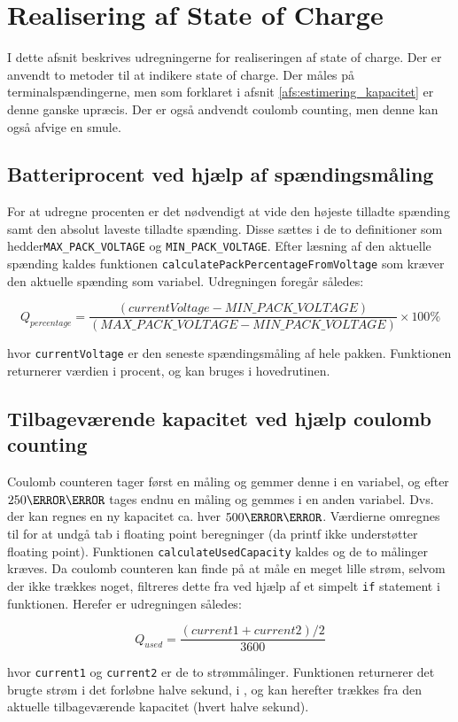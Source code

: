 \section{Realisering af State of Charge}\label{afs:SOC_realization}
I dette afsnit beskrives udregningerne for realiseringen af state of charge. Der er anvendt to metoder til at indikere state of charge. Der måles på terminalspændingerne, men som forklaret i afsnit \ref{afs:estimering_kapacitet} er denne ganske upræcis. Der er også andvendt coulomb counting, men denne kan også afvige en smule.

\subsection{Batteriprocent ved hjælp af spændingsmåling}
For at udregne procenten er det nødvendigt at vide den højeste tilladte spænding samt den absolut laveste tilladte spænding. Disse sættes i de to definitioner som hedder\newline \verb|MAX_PACK_VOLTAGE| og \verb|MIN_PACK_VOLTAGE|. Efter læsning af den aktuelle spænding kaldes funktionen \verb|calculatePackPercentageFromVoltage| som kræver den aktuelle spænding som variabel. Udregningen foregår således:

\begin {equation}
Q_{percentage} =  \frac{(\mathit{currentVoltage} - \mathit{MIN\_PACK\_VOLTAGE})}{(\mathit{MAX\_PACK\_VOLTAGE} - \mathit{MIN\_PACK\_VOLTAGE})} \times 100\percent
\label{eq:q_percentage}
\end {equation}

hvor \verb|currentVoltage| er den seneste spændingsmåling af hele pakken. Funktionen returnerer værdien i procent, og kan bruges i hovedrutinen.

\subsection{Tilbageværende kapacitet ved hjælp coulomb counting}
Coulomb counteren tager først en måling og gemmer denne i en variabel, og efter $250\milli\second$ tages endnu en måling og gemmes i en anden variabel. Dvs. der kan regnes en ny kapacitet ca. hver $500\milli\second$. Værdierne omregnes til \micro\ampere\space for at undgå tab i floating point beregninger (da printf ikke understøtter floating point). Funktionen \verb|calculateUsedCapacity| kaldes og de to målinger kræves. Da coulomb counteren kan finde på at måle en meget lille strøm, selvom der ikke trækkes noget, filtreres dette fra ved hjælp af et simpelt \verb|if| statement i funktionen. Herefer er udregningen således: 

\begin {equation}
Q_{used} =  \frac{(\mathit{current1} + \mathit{current2}) / 2}{3600}
\label{eq:q_used}
\end {equation}

hvor \verb|current1| og \verb|current2| er de to strømmålinger. Funktionen returnerer det brugte strøm i det forløbne halve sekund, i \micro\ampere, og kan herefter trækkes fra den aktuelle tilbageværende kapacitet (hvert halve sekund). 